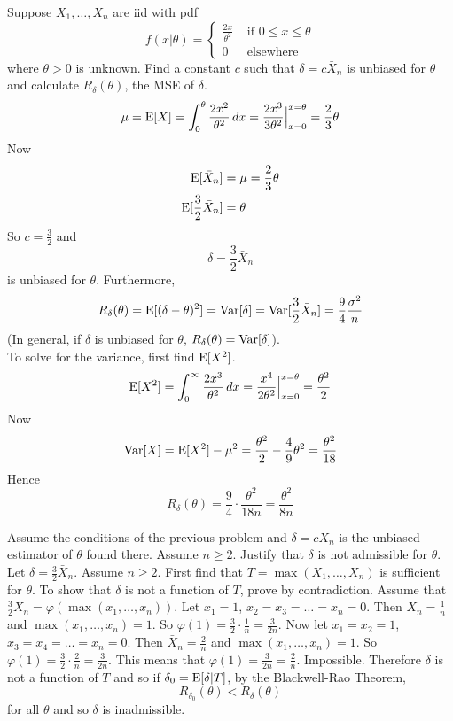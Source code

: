 \documentclass[12pt]{article}
\begin{document}
\begin{question} Suppose $X_1,\dots,X_n$ are iid with pdf $$f(x | \theta) = \begin{cases} \frac{2x}{\theta^2} &\text{ if } 0 \leq x \leq \theta \\ 0 &\text{ elsewhere } \end{cases} $$ where $\theta > 0$ is unknown. Find a constant $c$ such that $\delta = c\bar{X}_n$ is unbiased for $\theta$ and calculate $R_\delta(\theta)$, the MSE of $\delta$.  
$$ \mu = \mathrm{E}[ X ] = \int_0^\theta \frac{2x^2}{\theta^2} \, dx = \frac{2x^3}{3\theta^2}\Big|_{x=0}^{x=\theta} = \frac{2}{3}\theta $$ Now $$ \begin{aligned} \mathrm{E}[ \bar{X}_n ] &= \mu = \frac{2}{3}\theta \\ \mathrm{E}[ \frac{3}{2}\bar{X}_n ] &= \theta \end{aligned} $$ So $c = \frac{3}{2}$ and $$ \delta = \frac{3}{2}\bar{X}_n$$ is unbiased for $\theta$. Furthermore, $$ R_\delta(\theta) = \mathrm{E}[ (\delta-\theta)^2 ] = \mathrm{Var}[ \delta ] = \mathrm{Var}[ \frac{3}{2}\bar{X}_n ] = \frac{9}{4} \frac{\sigma^2}{n} $$ 
(In general, if $\delta$ is unbiased for $\theta$, $R_\delta(\theta) = \mathrm{Var}[ \delta ]$). \\
To solve for the variance, first find $\mathrm{E}[ X^2 ]$. $$ \mathrm{E}[ X^2 ] = \int_0^\infty \frac{2x^3}{\theta^2} \, dx = \frac{x^4}{2\theta^2}\Big|_{x = 0}^{x=\theta} = \frac{\theta^2}{2} $$ 
Now $$ \mathrm{Var}[ X ] = \mathrm{E}[ X^2 ] - \mu^2 = \frac{\theta^2}{2} - \frac{4}{9}\theta^2 = \frac{\theta^2}{18} $$ Hence $$R_\delta(\theta) = \frac{9}{4} \cdot \frac{\theta^2}{18n} = \frac{\theta^2}{8n} $$ 
\end{question} 

\begin{question} Assume the conditions of the previous problem and $\delta = c\bar{X}_n$ is the unbiased estimator of $\theta$ found there. Assume $n \geq 2$. Justify that $\delta$ is not admissible for $\theta$. \\
Let $\delta = \frac{3}{2}\bar{X}_n$. Assume $n\geq2$. First find that $T = \max(X_1,\dots,X_n)$ is sufficient for $\theta$. To show that $\delta$ is not a function of $T$, prove by contradiction. Assume that $\frac{3}{2}\bar{X}_n = \varphi(\max(x_1,\dots,x_n))$. Let $x_1=1$, $x_2 = x_3 = \dots = x_n = 0$. Then $\bar{X}_n = \frac{1}{n}$ and $\max(x_1,\dots,x_n) = 1$. So $\varphi(1) = \frac{3}{2}\cdot \frac{1}{n} = \frac{3}{2n}$. Now let $x_1=x_2=1$, $x_3 = x_4 = \dots = x_n = 0$. Then $\bar{X}_n = \frac{2}{n}$ and $\max(x_1,\dots,x_n) = 1$. So $\varphi(1) = \frac{3}{2} \cdot \frac{2}{n} = \frac{3}{2n}$. This means that $\varphi(1) = \frac{3}{2n} = \frac{2}{n}$. Impossible. Therefore $\delta$ is not a function of $T$ and so if $\delta_0 = \mathrm{E}[ \delta | T ]$, by the Blackwell-Rao Theorem, $$ R_{\delta_0}(\theta) < R_{\delta}(\theta) $$ for all $\theta$ and so $\delta$ is inadmissible. 

\end{question} 
\end{document}
